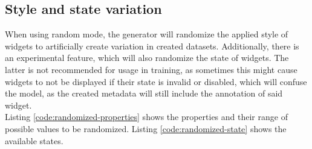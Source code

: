 \documentclass[Bachelor, BIC, english, fhCitStyle, IEEE]{BASE/twbook} %
\begin{document}
\subsection{Style and state variation}
When using random mode, the generator will randomize the applied style of widgets to artificially create variation in created datasets. Additionally, there is an experimental feature, which will also randomize the state of widgets. The latter is not recommended for usage in training, as sometimes this might cause widgets to not be displayed if their state is invalid or disabled, which will confuse the model, as the created metadata will still include the annotation of said widget.\\
Listing \ref{code:randomized-properties} shows the properties and their range of possible values to be randomized. Listing \ref{code:randomized-state} shows the available states.
\end{document}
